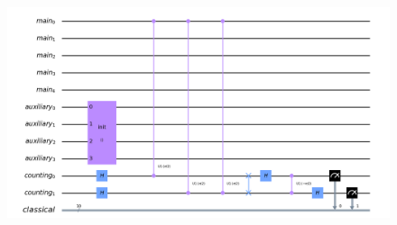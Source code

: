 \documentclass{article}
\begin{document}
\begin{figure}
  \includegraphics[width=linewidth]{unknown-4.png}
\end{figure}




\printbibliography
\end{document}
